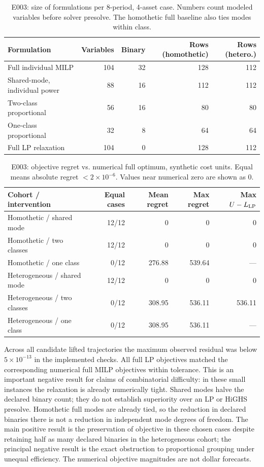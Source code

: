 \documentclass[11pt,letterpaper]{article}
\begin{document}
\begin{table}[htbp]
\small\centering
\caption{E003: size of formulations per 8-period, 4-asset case. Numbers count modeled variables before solver presolve. The homothetic full baseline also ties modes within class.}
\begin{tabular}{lrrrr}
\toprule
Formulation & Variables & Binary & Rows (homothetic) & Rows (hetero.)\\
\midrule
Full individual MILP &104&32&128&112\\
Shared-mode, individual power &88&16&112&112\\
Two-class proportional &56&16&80&80\\
One-class proportional &32&8&64&64\\
Full LP relaxation &104&0&128&112\\
\bottomrule
\end{tabular}
\end{table}
\begin{table}[htbp]
\small\centering
\caption{E003: objective regret vs. numerical full optimum, synthetic cost units. Equal means absolute regret $<2\times10^{-6}$. Values near numerical zero are shown as 0.}
\begin{tabularx}{\linewidth}{Yrrrr}
\toprule
Cohort / intervention & Equal cases & Mean regret & Max regret & Max $U-L_{\rm LP}$\\
\midrule
Homothetic / shared mode &12/12&0&0&0\\
Homothetic / two classes &12/12&0&0&0\\
Homothetic / one class &0/12&276.88&539.64&---\\
Heterogeneous / shared mode &12/12&0&0&0\\
Heterogeneous / two classes &0/12&308.95&536.11&536.11\\
Heterogeneous / one class &0/12&308.95&536.11&---\\
\bottomrule
\end{tabularx}
\end{table}
Across all candidate lifted trajectories the maximum observed residual was below $5\times10^{-13}$ in the implemented checks. All full LP objectives matched the corresponding numerical full MILP objectives within tolerance. This is an important negative result for claims of combinatorial difficulty: in these small instances the relaxation is already numerically tight. Shared modes halve the declared binary count; they do not establish superiority over an LP or HiGHS presolve. Homothetic full modes are already tied, so the reduction in declared binaries there is not a reduction in independent mode degrees of freedom. The main positive result is the preservation of objective in these chosen cases despite retaining half as many declared binaries in the heterogeneous cohort; the principal negative result is the exact obstruction to proportional grouping under unequal efficiency. The numerical objective magnitudes are not dollar forecasts.
\end{document}
